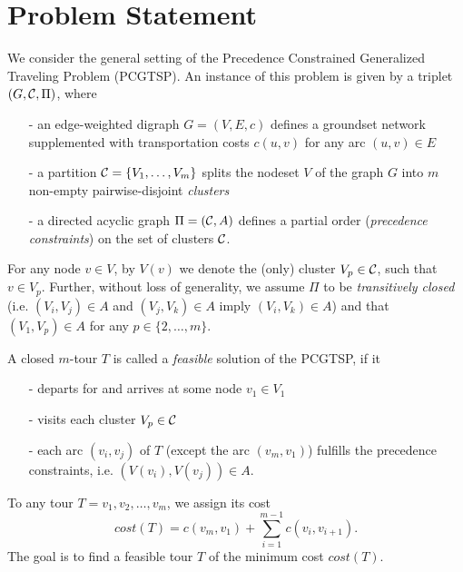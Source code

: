 \section{Problem Statement}\label{sec:PS}
We consider the general setting of the Precedence Constrained Generalized Traveling Problem (PCGTSP). An instance of this problem is given by a triplet $(G,\mathcal{C},\Pi)$, where
\begin{itemize}
	\item[-] an edge-weighted digraph $G=(V,E,c)$ defines a groundset network supplemented with transportation costs $c(u,v)$ for any arc $(u,v)\in E$
	\item[-] a partition $\mathcal{C}=\{V_1,\ldots,V_m\}$ splits the nodeset $V$ of the graph $G$ into $m$ non-empty pairwise-disjoint \textit{clusters}
	\item[-] a directed acyclic graph $\Pi=(\mathcal{C},A)$ defines a partial order (\textit{precedence constraints}) on the set of clusters $\mathcal{C}$.      
\end{itemize}

For any node $v\in V$, by $V(v)$ we denote the (only) cluster $V_p\in\mathcal{C}$, such that $v\in V_p$. Further, without loss of generality, we assume $\Pi$ to be \textit{transitively closed} (i.e.  $(V_i,V_j)\in A$ and $(V_j,V_k)\in A$ imply $(V_i,V_k)\in A$) and that $(V_1,V_p)\in A$ for any $p\in\{2,\ldots,m\}$.

A closed $m$-tour $T$ is called a \textit{feasible} solution of the PCGTSP, if it
\begin{itemize}
	\item[-] departs for and arrives at some node $v_1\in V_1$
	\item[-] visits each cluster $V_p\in\mathcal{C}$
	\item[-] each arc $(v_i, v_j)$ of  $T$ (except the arc $(v_m,v_1)$) fulfills the precedence constraints, i.e. $(V(v_i),V(v_j))\in A$.
\end{itemize} 

To any tour $T=v_1, v_2, \ldots, v_m$, we assign its cost
$$
	cost(T) = c(v_m,v_1) + \sum_{i=1}^{m-1} c(v_i,v_{i+1}). 
$$ 
The goal is to find a feasible tour $T$ of the minimum cost $cost(T)$. 